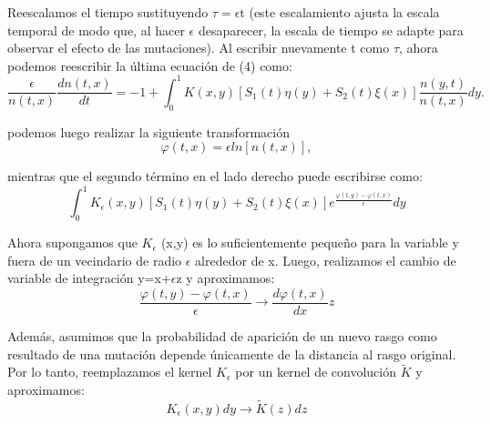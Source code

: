 \documentclass[letterpaper]{article}
\begin{document}
{        \normalsize{Reescalamos el tiempo sustituyendo $\tau=\epsilon$t (este escalamiento ajusta la escala temporal de modo que, al hacer $\epsilon$ desaparecer, la escala de tiempo se adapte para observar el efecto de las mutaciones). Al escribir nuevamente t como $\tau$, ahora podemos reescribir la última ecuación de (4) como:}\\

        \begin{equation}
            \frac{\epsilon}{n(t,x)}\frac{d n(t,x)}{dt}=-1+\int_{0}^{1}K(x,y)[S_1(t)\eta(y)+S_2(t)\xi(x)]\frac{n(y,t)}{n(t,x)}dy.
        \end{equation}

        \normalsize{podemos luego realizar la siguiente transformación}\\

        \begin{equation}
            \varphi(t,x)=\epsilon ln[n(t,x)],
        \end{equation}

        \normalsize{mientras que el segundo término en el lado derecho puede escribirse como:}\\

        \begin{equation}
            \int_{0}^{1}K_{\epsilon}(x,y)[S_1(t)\eta(y)+S_2(t)\xi(x)]e^{\frac{\varphi(t,y)-\varphi(t,x)}{\epsilon}}dy
        \end{equation}

        \normalsize{Ahora supongamos que $K_{\epsilon}$ (x,y) es lo suficientemente pequeño para la variable y fuera de un vecindario de radio $\epsilon$ alrededor de x. Luego, realizamos el cambio de variable de integración y=x+$\epsilon$z y aproximamos:}\\

        \begin{equation}
            \frac{\varphi(t,y)-\varphi(t,x)}{\epsilon} \to \frac{d\varphi(t,x) }{dx}z
        \end{equation}

        \normalsize{Además, asumimos que la probabilidad de aparición de un nuevo rasgo como resultado de una mutación depende únicamente de la distancia al rasgo original. Por lo tanto, reemplazamos el kernel $K_{\epsilon}$ por un kernel de convolución $\widetilde{K}$ y aproximamos:}\\

        \begin{equation}
            K_{\epsilon}(x,y)dy\longrightarrow \widetilde{K}(z)dz


\end{equation}}
\end{document}
